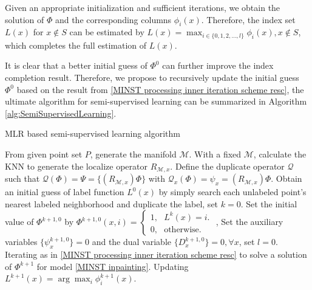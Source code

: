 \documentclass[letterpaper,10pt]{article}
\begin{document}
Given an appropriate initialization and sufficient iterations, we obtain the solution of $\Phi$ and the corresponding columns $\phi_i(x)$. Therefore, the index set $L(x)$ for $x \notin S$ can be estimated by $L(x) = \max_{i \in \{0,1,2,\ldots,l\}} \phi_i(x), x \notin S$, which completes the full estimation of $L(x)$.

It is clear that a better initial guess of $\Phi^0$ can further improve the index completion result. Therefore, we propose to recursively update the initial guess $\Phi^0$ based on the result from \eqref{MINST processing inner iteration scheme resc}, the ultimate algorithm for semi-supervised learning can be summarized in Algorithm \ref{alg:SemiSupervisedLearning}.


\begin{algorithm}

\caption{MLR based semi-supervised learning algorithm}
\label{alg:SemiSupervisedLearning}
\begin{algorithmic}


 From given point set $P$, generate the manifold $\mathcal{M}$. With a fixed $\mathcal{M}$, calculate the KNN to generate the localize operator $R_{\mathcal{M},x}$. Define the duplicate operator $\mathcal{Q}$ such that $\mathcal{Q} (\Phi) = \Psi = \{(R_{\mathcal{M},x}) \Phi\}$ with $\mathcal{Q}_x (\Phi) = \psi_x = (R_{\mathcal{M},x}) \Phi$. Obtain an initial guess of label function $L^0(x)$ by simply search each unlabeled point's nearest labeled neighborhood and duplicate the label, set $k=0$.
 Set the initial value of $\Phi^{k+1,0}$ by $\Phi^{k+1,0}(x,i) = \begin{cases}1, \ \ \ L^k(x) = i.\\0, \ \ \ \text{otherwise}. \end{cases}$ , Set the auxiliary variables $\{\psi_x^{k+1,0}\} = 0$ and the dual variable $\{D_{x}^{k+1,0}\} = 0, \forall x$, set $l=0$.
 Iterating as in \eqref{MINST processing inner iteration scheme resc} to solve a solution of $\Phi^{k+1}$ for model \eqref{MINST inpainting}.
 Updating $L^{k+1}(x)=\arg\max_i \phi^{k+1}_{i}(x)$.
\ENDWHILE


\end{algorithmic}
\end{algorithm}
\end{document}
